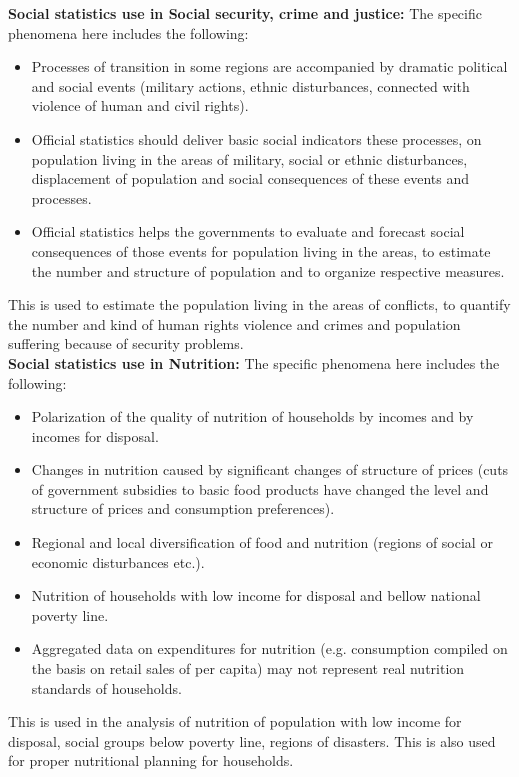 \documentclass[11pt]{article}
\begin{document}
\noindent\textbf{Social statistics use in Social security, crime and justice:} The specific phenomena here includes the following:
\begin{itemize}
\item Processes of transition in some regions are accompanied by dramatic political and social events (military actions, ethnic disturbances, connected with violence of human and civil rights).
\item Official statistics should deliver basic social indicators these processes, on population living in the areas of military, social or ethnic disturbances, displacement of population and social consequences of these events and processes.
\item Official statistics helps the governments to evaluate and forecast social consequences
of those events for population living in the areas, to estimate the number and structure
of population and to organize respective measures.
\end{itemize}
\noindent This is used to estimate the  population living in the areas of conflicts, to quantify the
number and kind of human rights violence and crimes and  population suffering because
of security problems. \\

\noindent\textbf{Social statistics use in Nutrition:} The specific phenomena here includes the following:
\begin{itemize}
\item Polarization of the quality of nutrition of households by incomes and by incomes for
  disposal.
\item Changes in nutrition caused by significant changes of structure of prices (cuts of
government subsidies to basic food products have changed the level and structure of
prices and consumption preferences).
\item Regional and local diversification of food and nutrition (regions of social or economic
  disturbances etc.).
\item Nutrition of households with low income for disposal and bellow national poverty line.
\item Aggregated data on expenditures for nutrition (e.g. consumption compiled on the basis
on retail sales of per capita) may not represent real nutrition standards of households.  
\end{itemize}
\noindent This is used in the analysis of nutrition of population with low income for disposal, social groups below poverty line, regions of disasters. This is also used for proper nutritional planning for households.
\end{document}
